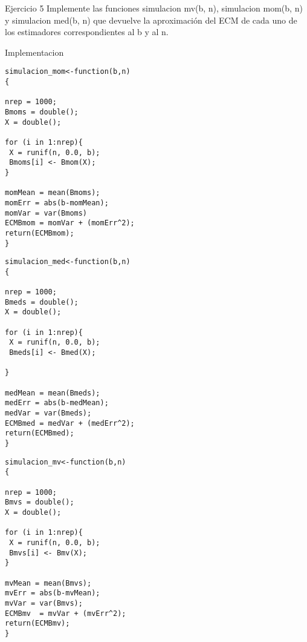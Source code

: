



\begin{section}{Ejercicio 5}
Implemente las funciones simulacion mv(b, n), simulacion mom(b, n) y simulacion med(b, n)
que devuelve la aproximación del ECM de cada uno de los estimadores correspondientes al b
y al n.

\begin{subsection}{Implementacion}~\\



\begin{verbatim}
simulacion_mom<-function(b,n)
{

nrep = 1000;
Bmoms = double();
X = double();

for (i in 1:nrep){
 X = runif(n, 0.0, b);
 Bmoms[i] <- Bmom(X);
}

momMean = mean(Bmoms);
momErr = abs(b-momMean);
momVar = var(Bmoms)
ECMBmom = momVar + (momErr^2);
return(ECMBmom);
}
\end{verbatim}


\begin{verbatim}
simulacion_med<-function(b,n)
{

nrep = 1000;
Bmeds = double();
X = double();

for (i in 1:nrep){
 X = runif(n, 0.0, b);
 Bmeds[i] <- Bmed(X);

}

medMean = mean(Bmeds);
medErr = abs(b-medMean);
medVar = var(Bmeds);
ECMBmed = medVar + (medErr^2);
return(ECMBmed);
}
\end{verbatim}


\begin{verbatim}
simulacion_mv<-function(b,n)
{

nrep = 1000;
Bmvs = double();
X = double();

for (i in 1:nrep){
 X = runif(n, 0.0, b);
 Bmvs[i] <- Bmv(X);
}

mvMean = mean(Bmvs);
mvErr = abs(b-mvMean);
mvVar = var(Bmvs);
ECMBmv  = mvVar + (mvErr^2);
return(ECMBmv);
}
\end{verbatim}


\end{subsection}
\end{section}